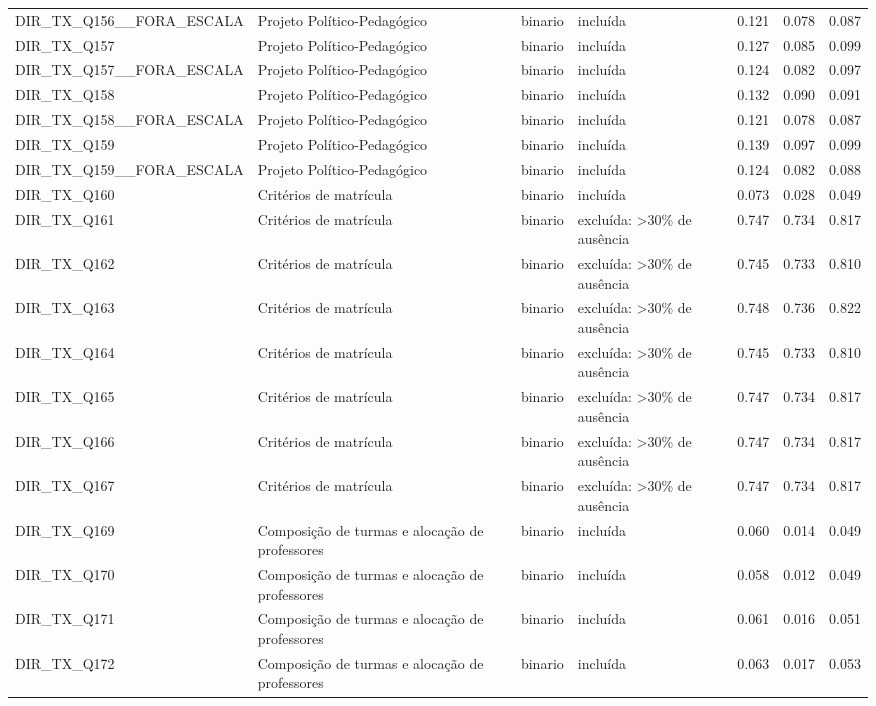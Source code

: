 \begin{tabular}{llllrrr}
DIR\_TX\_Q156\_\_FORA\_ESCALA & Projeto Político-Pedagógico & binario & incluída & 0.121 & 0.078 & 0.087 \\
DIR\_TX\_Q157 & Projeto Político-Pedagógico & binario & incluída & 0.127 & 0.085 & 0.099 \\
DIR\_TX\_Q157\_\_FORA\_ESCALA & Projeto Político-Pedagógico & binario & incluída & 0.124 & 0.082 & 0.097 \\
DIR\_TX\_Q158 & Projeto Político-Pedagógico & binario & incluída & 0.132 & 0.090 & 0.091 \\
DIR\_TX\_Q158\_\_FORA\_ESCALA & Projeto Político-Pedagógico & binario & incluída & 0.121 & 0.078 & 0.087 \\
DIR\_TX\_Q159 & Projeto Político-Pedagógico & binario & incluída & 0.139 & 0.097 & 0.099 \\
DIR\_TX\_Q159\_\_FORA\_ESCALA & Projeto Político-Pedagógico & binario & incluída & 0.124 & 0.082 & 0.088 \\
DIR\_TX\_Q160 & Critérios de matrícula & binario & incluída & 0.073 & 0.028 & 0.049 \\
DIR\_TX\_Q161 & Critérios de matrícula & binario & excluída: >30\% de ausência & 0.747 & 0.734 & 0.817 \\
DIR\_TX\_Q162 & Critérios de matrícula & binario & excluída: >30\% de ausência & 0.745 & 0.733 & 0.810 \\
DIR\_TX\_Q163 & Critérios de matrícula & binario & excluída: >30\% de ausência & 0.748 & 0.736 & 0.822 \\
DIR\_TX\_Q164 & Critérios de matrícula & binario & excluída: >30\% de ausência & 0.745 & 0.733 & 0.810 \\
DIR\_TX\_Q165 & Critérios de matrícula & binario & excluída: >30\% de ausência & 0.747 & 0.734 & 0.817 \\
DIR\_TX\_Q166 & Critérios de matrícula & binario & excluída: >30\% de ausência & 0.747 & 0.734 & 0.817 \\
DIR\_TX\_Q167 & Critérios de matrícula & binario & excluída: >30\% de ausência & 0.747 & 0.734 & 0.817 \\
DIR\_TX\_Q169 & Composição de turmas e alocação de professores & binario & incluída & 0.060 & 0.014 & 0.049 \\
DIR\_TX\_Q170 & Composição de turmas e alocação de professores & binario & incluída & 0.058 & 0.012 & 0.049 \\
DIR\_TX\_Q171 & Composição de turmas e alocação de professores & binario & incluída & 0.061 & 0.016 & 0.051 \\
DIR\_TX\_Q172 & Composição de turmas e alocação de professores & binario & incluída & 0.063 & 0.017 & 0.053 \\

\end{tabular}
